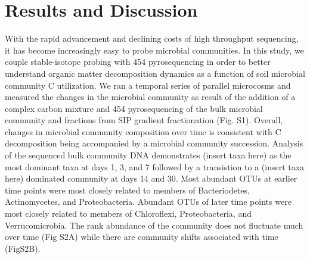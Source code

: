 \section{Results and Discussion}

With the rapid advancement and declining costs of high throughput sequencing, it has become increasingly easy to probe microbial communities.  In this study, we couple stable-isotope probing with 454 pyrosequencing in order to better understand organic matter decomposition dynamics as a function of soil microbial community C utilization. We ran a temporal series of parallel microcosms and measured the changes in the microbial community as result of the addition of a complex carbon mixture and 454 pyrosequencing of the bulk microbial community and fractions from SIP gradient fractionation (Fig. S1). Overall, changes in microbial community composition over time is consistent with C decomposition being accompanied by a microbial community succession. Analysis of the sequenced bulk community DNA demonstrates (insert taxa here) as the most dominant taxa at days 1, 3, and 7 followed by a transistion to a (insert taxa here) dominated community at days 14 and 30. Most abundant OTUs at earlier time points were most closely related to members of Bacteriodetes, Actinomycetes, and Proteobacteria. Abundant OTUs of later time points were most closely related to members of Chloroflexi, Proteobacteria, and Verrucomicrobia.  The rank abundance of the community does not fluctuate much over time (Fig S2A) while there are community shifts associated with time (FigS2B).   

